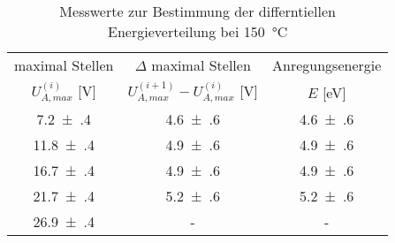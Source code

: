 \begin{table}[!h]
	\centering
	\begin{tabular}{|c|c|c|}
		\hline
		maximal Stellen & $\Delta$ maximal Stellen & Anregungsenergie\\
		$U_{A,max}^{(i)}$ [\si{\volt}] & $U_{A,max}^{(i+1)} - U_{A,max}^{(i)}$ [\si{\volt}] & $E$ [\si{\eV}]\\
\hline\hline
		\num{7.2(4)} & \num{4.6(6)} & \num{4.6(6)}\\
		\num{11.8(4)} & \num{4.9(6)} & \num{4.9(6)}\\
		\num{16.7(4)} & \num{4.9(6)} & \num{4.9(6)}\\
		\num{21.7(4)} & \num{5.2(6)} & \num{5.2(6)}\\
		\num{26.9(4)} & - & -\\
		\hline
	\end{tabular}
	\caption{Messwerte zur Bestimmung der differntiellen Energieverteilung bei \SI{150}{\degreeCelsius} \label{tab:Auswertung_FranckHertz_Maxima}}
\end{table}
